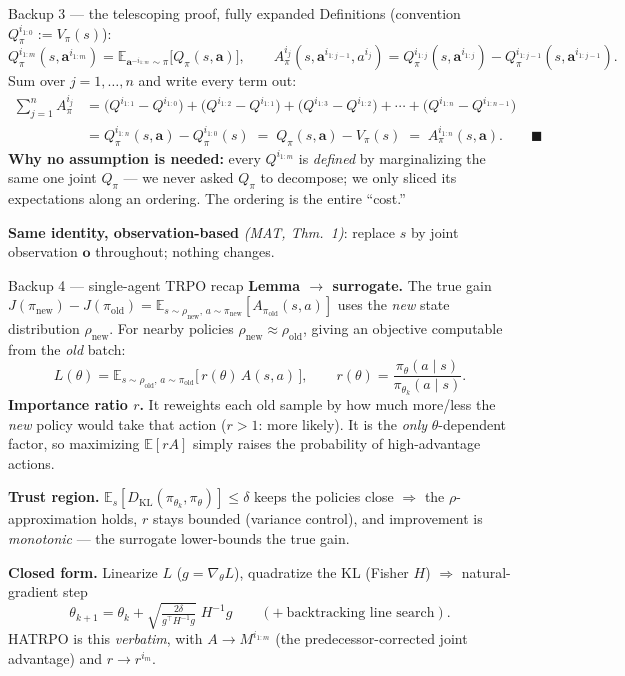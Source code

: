 \documentclass[10pt, aspectratio=169]{beamer}
\newcommand{\paper}[1]{\textcolor{mLightBrown}{\small\textit{(#1)}}}
\begin{document}
\begin{frame}{Backup 3 --- the telescoping proof, fully expanded}
\footnotesize
Definitions (convention $Q^{i_{1:0}}_\pi := V_\pi(s)$):
\[
Q^{i_{1:m}}_{\pi}(s,\mathbf{a}^{i_{1:m}}) = \mathbb{E}_{\mathbf{a}^{-i_{1:m}}\sim\pi}\big[Q_\pi(s,\mathbf{a})\big],
\qquad
A^{i_j}_{\pi}(s,\mathbf{a}^{i_{1:j-1}},a^{i_j}) = Q^{i_{1:j}}_{\pi}(s,\mathbf{a}^{i_{1:j}}) - Q^{i_{1:j-1}}_{\pi}(s,\mathbf{a}^{i_{1:j-1}}).
\]
Sum over $j = 1,\dots,n$ and write every term out:
\begin{align*}
\sum_{j=1}^{n} A^{i_j}_{\pi}
&= \big( Q^{i_{1:1}} - Q^{i_{1:0}} \big) + \big( Q^{i_{1:2}} - Q^{i_{1:1}} \big) + \big( Q^{i_{1:3}} - Q^{i_{1:2}} \big) + \cdots + \big( Q^{i_{1:n}} - Q^{i_{1:n-1}} \big) \\
&= Q^{i_{1:n}}_{\pi}(s,\mathbf{a}) - Q^{i_{1:0}}_{\pi}(s) \;=\; Q_{\pi}(s,\mathbf{a}) - V_{\pi}(s) \;=\; A^{i_{1:n}}_{\pi}(s,\mathbf{a}). \qquad\blacksquare
\end{align*}
\medskip
\textbf{Why no assumption is needed:} every $Q^{i_{1:m}}$ is \emph{defined} by marginalizing the same one joint $Q_\pi$ --- we never asked $Q_\pi$ to decompose; we only sliced its expectations along an ordering. The ordering is the entire ``cost.''
\medskip

\textbf{Same identity, observation-based} \paper{MAT, Thm.\ 1}: replace $s$ by joint observation $\mathbf{o}$ throughout; nothing changes.
\end{frame}

\begin{frame}{Backup 4 --- single-agent TRPO recap}
\small
\textbf{Lemma $\to$ surrogate.} The true gain $J(\pi_{\text{new}})-J(\pi_{\text{old}}) = \mathbb{E}_{s\sim\rho_{\text{new}},\,a\sim\pi_{\text{new}}}[A_{\pi_{\text{old}}}(s,a)]$ uses the \emph{new} state distribution $\rho_{\text{new}}$. For nearby policies $\rho_{\text{new}}\approx\rho_{\text{old}}$, giving an objective computable from the \emph{old} batch:
\[
L(\theta) = \mathbb{E}_{s\sim\rho_{\text{old}},\,a\sim\pi_{\text{old}}}\big[\, r(\theta)\, A(s,a)\,\big], \qquad r(\theta)=\frac{\pi_\theta(a\mid s)}{\pi_{\theta_k}(a\mid s)}.
\]
\textbf{Importance ratio $r$.} It reweights each old sample by how much more/less the \emph{new} policy would take that action ($r>1$: more likely). It is the \emph{only} $\theta$-dependent factor, so maximizing $\mathbb{E}[rA]$ simply raises the probability of high-advantage actions.
\smallskip

\textbf{Trust region.} $\mathbb{E}_s[D_{\mathrm{KL}}(\pi_{\theta_k},\pi_\theta)]\le\delta$ keeps the policies close $\Rightarrow$ the $\rho$-approximation holds, $r$ stays bounded (variance control), and improvement is \emph{monotonic} --- the surrogate lower-bounds the true gain.
\smallskip

\textbf{Closed form.} Linearize $L$ ($g=\nabla_\theta L$), quadratize the KL (Fisher $H$) $\Rightarrow$ natural-gradient step
\[
\theta_{k+1} = \theta_k + \sqrt{\tfrac{2\delta}{g^\top H^{-1} g}}\; H^{-1} g \qquad (+\ \text{backtracking line search}).
\]
{\footnotesize\textcolor{mLightBrown}{HATRPO is this \emph{verbatim}, with $A\to M^{i_{1:m}}$ (the predecessor-corrected joint advantage) and $r\to r^{i_m}$.}}
\end{frame}
\end{document}
